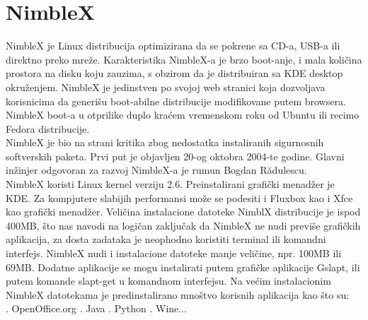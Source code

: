 \documentclass[12pt,vi]{mitthesis}
\begin{document}
\section*{NimbleX}
\indent
NimbleX je Linux distribucija optimizirana da se pokrene sa CD-a, USB-a ili direktno preko mreže. Karakteristika NimbleX-a je brzo boot-anje, i mala količina prostora na disku koju zauzima, s obzirom da je distribuiran sa KDE desktop okruženjem. NimbleX je jedinstven po svojoj web stranici koja dozvoljava korisnicima da generišu boot-abilne distribucije modifikovane putem browsera. NimbleX boot-a u otprilike duplo kraćem vremenskom roku od Ubuntu ili recimo Fedora distribucije.\\
NimbleX je bio na strani kritika zbog nedostatka instaliranih sigurnosnih softverskih paketa. Prvi put je objavljen 20-og oktobra 2004-te godine. Glavni inžinjer odgovoran za razvoj NimbleX-a je rumun Bogdan Rădulescu.\\
\indent
NimbleX koristi Linux kernel verziju 2.6. Preinstalirani grafički menadžer je KDE. Za kompjutere slabijih performansi može se podesiti i Fluxbox kao i Xfce kao grafički menadžer. Veličina instalacione datoteke NimblX distribucije je ispod 400MB, što nas navodi na logičan zaključak da NimbleX ne nudi previše grafičkih aplikacija, za dosta zadataka je neophodno koristiti terminal ili komandni interfejs. NimbleX nudi i instalacione datoteke manje veličine, npr. 100MB ili 69MB. Dodatne aplikacije se mogu instalirati putem grafičke aplikacije Gslapt, ili putem komande slapt-get u komandnom interfejsu. Na većim instalacionim NimbleX datotekama je predinstalirano mnoštvo korisnih aplikacija kao što su:\\
. OpenOffice.org
. Java
. Python
. Wine...
\end{document}
